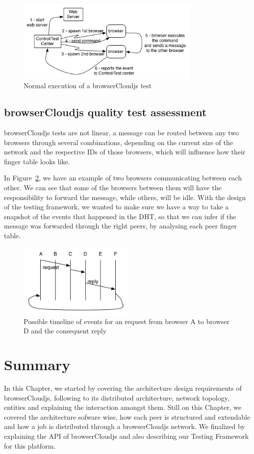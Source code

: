 \begin{figure}[h!]
  \centering
  \includegraphics[width=0.8\textwidth]{figs/testing-framework-1}
  \caption{Normal execution of a browserCloudjs test}
  \label{fig:t-f-1}
\end{figure}

\subsection{browserCloudjs quality test assessment}

browserCloudjs tests are not linear, a message can be routed between any two browsers through several combinations, depending on the current size of the network and the respective IDs of those browsers, which will influence how their finger table looks like.

In Figure~\ref{fig:t-f-2}, we have an example of two browsers communicating between each other. We can see that some of the browsers between them will have the responsibility to forward the message, while others, will be idle. With the design of the testing framework, we wanted to make sure we have a way to take a snapshot of the events that happened in the DHT, so that we can infer if the message was forwarded through the right peers, by analysing each peer finger table.

\begin{figure}[h!]
  \centering
  \includegraphics[width=0.5\textwidth]{figs/testing-framework-2}
  \caption{Possible timeline of events for an request from browser A to browser D and the consequent reply}
  \label{fig:t-f-2}
\end{figure}

\section{Summary}

In this Chapter, we started by covering the architecture design requirements of browserCloudjs, following to its distributed architecture, network topology, entities and explaining the interaction amongst them. Still on this Chapter, we covered the architecture sofware wise, how each peer is structured and extendable and how a job is distributed through a browserCloudjs network. We finalized by explaining the API of browserCloudjs and also describing our Testing Framework for this platform.
